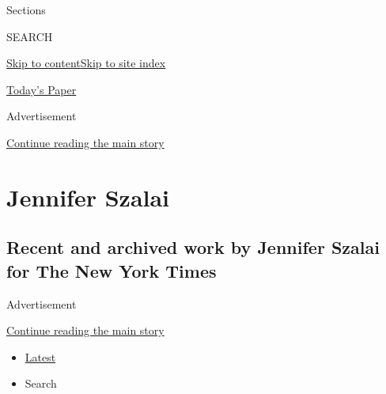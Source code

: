 Sections

SEARCH

\protect\hyperlink{site-content}{Skip to
content}\protect\hyperlink{site-index}{Skip to site index}

\href{https://myaccount.nytimes3xbfgragh.onion/auth/login?response_type=cookie\&client_id=vi}{}

\href{https://www.nytimes3xbfgragh.onion/section/todayspaper}{Today's
Paper}

Advertisement

\protect\hyperlink{after-top}{Continue reading the main story}

\hypertarget{jennifer-szalai}{%
\section{Jennifer Szalai}\label{jennifer-szalai}}

\hypertarget{recent-and-archived-work-by-jennifer-szalai-for-the-new-york-times}{%
\subsection{Recent and archived work by Jennifer Szalai for The New York
Times}\label{recent-and-archived-work-by-jennifer-szalai-for-the-new-york-times}}

Advertisement

\protect\hyperlink{after-mid1}{Continue reading the main story}

\begin{itemize}
\tightlist
\item
  \protect\hyperlink{stream-panel}{Latest}
\item
  Search
\end{itemize}

